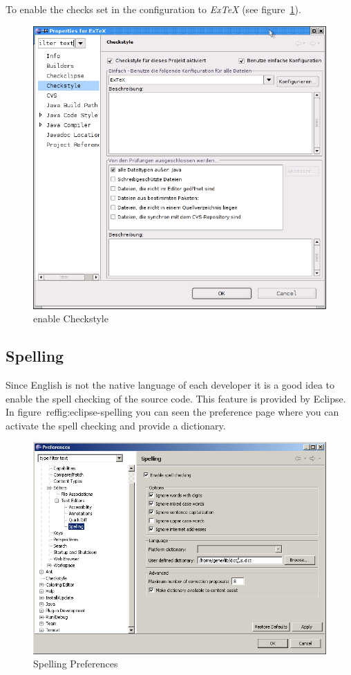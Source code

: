 To enable the checks set in 
the configuration to \emph{ExTeX} (see figure~\ref{fig:eclipse-checkstyle-enable}).
\begin{figure}[htp]
  \centering  \includegraphics[scale=.5]{image/eclipse-checkstyle-enable}
  \caption{enable Checkstyle}\label{fig:eclipse-checkstyle-enable}
\end{figure}


\subsection{Spelling}

Since English is not the native language of each developer it is a
good idea to enable the spell checking of the source code. This
feature is provided by Eclipse. In figure~ref{fig:eclipse-spelling}
you can seen the preference page where you can activate the spell
checking and provide a dictionary.
\begin{figure}[htp]
  \centering
  \includegraphics[scale=.4]{image/spelling}
  \caption{Spelling Preferences}\label{fig:eclipse-spelling}
\end{figure}

